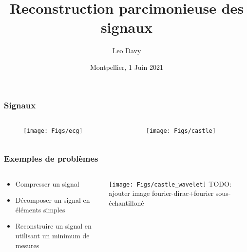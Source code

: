 \documentclass{beamer}
\title[]{Reconstruction parcimonieuse des signaux}
\author[Leo Davy]{Leo Davy}
\institute{Universit\'e de Montpellier}
\date[]{Montpellier, 1 Juin 2021}
\begin{document}
	\frame{\titlepage}

	\begin{frame}
		\frametitle{Signaux}
		\begin{columns}[T]
			\begin{column}{.65\textwidth}
				\begin{figure}
					\texttt{[image: Figs/ecg]}
				\end{figure}
			\end{column}		
			\begin{column}{.3\textwidth}
				\begin{figure}
					\texttt{[image: Figs/castle]}
				\end{figure}
			\end{column}
		\end{columns}
	\end{frame}

	\begin{frame}
		\frametitle{Exemples de problèmes}
		\begin{columns}[T]
			\begin{column}{.35\textwidth}
				\begin{itemize}
					\item Compresser un signal
					\item Décomposer un signal en éléments simples
					\item Reconstruire un signal en utilisant un minimum de mesures
				\end{itemize}
			\end{column}
			\begin{column}{.6\textwidth}
				\texttt{[image: Figs/castle\_wavelet]}
				TODO: ajouter image fourier-dirac+fourier sous-échantilloné
			\end{column}
		\end{columns}
	\end{frame}
\end{document}
